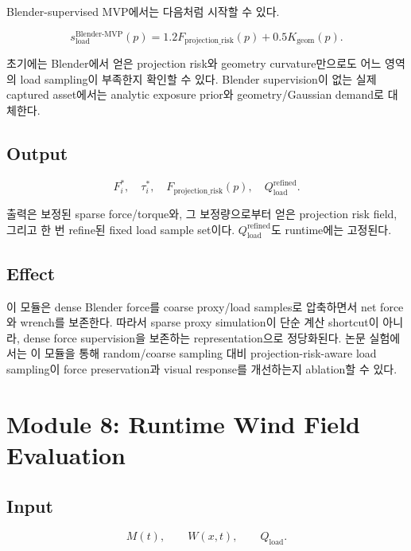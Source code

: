 \documentclass[11pt,a4paper]{article}
\begin{document}
Blender-supervised MVP에서는 다음처럼 시작할 수 있다.

\begin{equation}
s_{\mathrm{load}}^{\mathrm{Blender\text{-}MVP}}(p)=1.2F_{\mathrm{projection\_risk}}(p)+0.5K_{\mathrm{geom}}(p).
\end{equation}

초기에는 Blender에서 얻은 projection risk와 geometry curvature만으로도 어느 영역의 load sampling이 부족한지 확인할 수 있다.
Blender supervision이 없는 실제 captured asset에서는 analytic exposure prior와 geometry/Gaussian demand로 대체한다.

\subsection*{Output}

\begin{equation}
F_i^*,\quad \tau_i^*,\quad F_{\mathrm{projection\_risk}}(p),\quad Q_{\mathrm{load}}^{\mathrm{refined}}.
\end{equation}

출력은 보정된 sparse force/torque와, 그 보정량으로부터 얻은 projection risk field, 그리고 한 번 refine된 fixed load sample set이다.
$Q_{\mathrm{load}}^{\mathrm{refined}}$도 runtime에는 고정된다.

\subsection*{Effect}

이 모듈은 dense Blender force를 coarse proxy/load samples로 압축하면서 net force와 wrench를 보존한다. 따라서 sparse proxy simulation이 단순 계산 shortcut이 아니라, dense force supervision을 보존하는 representation으로 정당화된다.
논문 실험에서는 이 모듈을 통해 random/coarse sampling 대비 projection-risk-aware load sampling이 force preservation과 visual response를 개선하는지 ablation할 수 있다.

\section{Module 8: Runtime Wind Field Evaluation}

\subsection*{Input}

\begin{equation}
M(t),\qquad W(x,t),\qquad Q_{\mathrm{load}}.
\end{equation}
\end{document}
